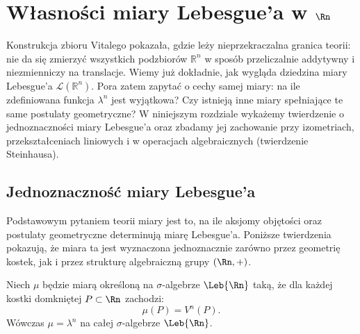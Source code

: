 \section{Własności miary Lebesgue'a w $\Rn$}

Konstrukcja zbioru Vitalego pokazała, gdzie leży nieprzekraczalna granica teorii: nie da się zmierzyć wszystkich podzbiorów $\mathbb{R}^n$ w sposób przeliczalnie addytywny i niezmienniczy na translacje. Wiemy już dokładnie, jak wygląda dziedzina miary Lebesgue’a $\mathcal{L}(\mathbb{R}^n)$. Pora zatem zapytać o cechy samej miary: na ile zdefiniowana funkcja $\lambda^n$ jest wyjątkowa? Czy istnieją inne miary spełniające te same postulaty geometryczne? W niniejszym rozdziale wykażemy twierdzenie o jednoznaczności miary Lebesgue'a oraz zbadamy jej zachowanie przy izometriach, przekształceniach liniowych i w operacjach algebraicznych (twierdzenie Steinhausa).

\subsection{Jednoznaczność miary Lebesgue'a}

Podstawowym pytaniem teorii miary jest to, na ile aksjomy objętości oraz postulaty geometryczne determinują miarę Lebesgue'a. Poniższe twierdzenia pokazują, że miara ta jest wyznaczona jednoznacznie zarówno przez geometrię kostek, jak i przez strukturę algebraiczną grupy $(\Rn, +)$.

\begin{tw}\label{tw:jednoznacznosc_kostki}
    Niech $\mu$ będzie miarą określoną na $\sigma$-algebrze $\Leb{\Rn}$ taką, że dla każdej kostki domkniętej $P \subset \Rn$ zachodzi:
    \begin{equation}
        \mu(P) = V^n(P).
    \end{equation}
    Wówczas $\mu = \lambda^n$ na całej $\sigma$-algebrze $\Leb{\Rn}$.
\end{tw}

